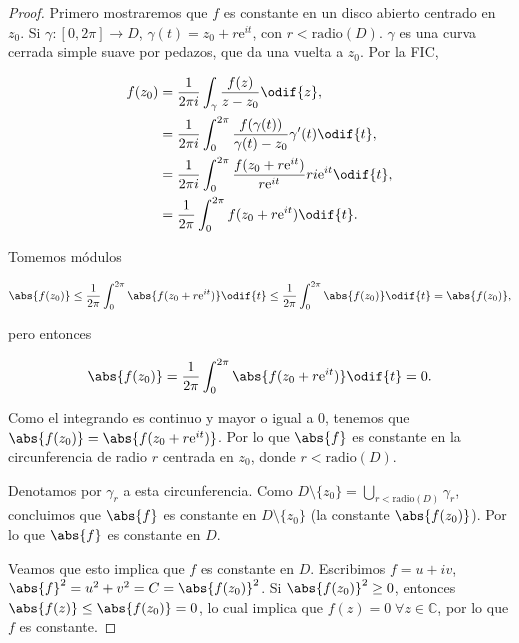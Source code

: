 \documentclass[../main.tex]{subfiles}
\begin{document}
\begin{proof}
    Primero mostraremos que \(f\) es constante en un disco abierto centrado en
    \(z_{0}\). Si \(\gamma \colon [0, 2\pi] \to D\), \(\gamma(t) = z_{0} + r
    \mathrm{e}^{it}\), con \( r < \mathrm{radio}(D)\). \(\gamma\) es una
    curva cerrada simple
    suave por pedazos, que da una vuelta a \(z_{0}\). Por la FIC,

    \begin{align*}
        f(z_{0}) &= \dfrac{1}{2\pi i}\int_{\gamma}^{}\dfrac{f(z)}{z - z_{0}}\odif{z},\\
        &= \dfrac{1}{2\pi i}\int_{0}^{2\pi}\dfrac{f(\gamma(t))}{\gamma(t) -
        z_{0}}\gamma^{\prime}(t)\odif{t},\\
        &= \dfrac{1}{2\pi i}\int_{0}^{2\pi}\dfrac{f(z_{0} + r \mathrm{e}^{it})}{r
        \mathrm{e}^{it}}ri \mathrm{e}^{it}\odif{t},\\
        &= \dfrac{1}{2\pi}\int_{0}^{2\pi}f(z_{0} + r \mathrm{e}^{it})\odif{t}.
    \end{align*}

    Tomemos módulos

    \begin{equation*}
        \abs{f(z_{0})} \leq \dfrac{1}{2\pi}\int_{0}^{2\pi}\abs{f(z_{0} + r
        \mathrm{e}^{it})}\odif{t} \leq
        \dfrac{1}{2\pi}\int_{0}^{2\pi}\abs{f(z_{0})}\odif{t} =
        \abs{f(z_{0})},
    \end{equation*}

    pero entonces

    \begin{equation*}
        \abs{f(z_{0})} = \dfrac{1}{2\pi} \int_{0}^{2\pi}\abs{f(z_{0} + r
        \mathrm{e}^{it})}\odif{t} = 0.
    \end{equation*}

    Como el integrando es continuo y mayor o igual a 0, tenemos que \(\abs{f(z_{0})} =
    \abs{f(z_{0} + r \mathrm{e}^{it})}\). Por lo que \(\abs{f}\) es constante en la
    circunferencia de radio \(r\) centrada en \(z_{0}\), donde \(r <
    \mathrm{radio}(D)\).

    Denotamos por \(\gamma_{r}\) a esta circunferencia. Como \(D\setminus \{z_{0}\} =
    \bigcup_{r < \mathrm{radio}(D)}\gamma_{r}\), concluimos que \(\abs{f}\)
    es constante en
    \(D\setminus \{z_{0}\}\) (la constante \(\abs{f(z_{0})}\)). Por lo que
    \(\abs{f}\) es
    constante en \(D\).

    Veamos que esto implica que \(f\) es constante en \(D\). Escribimos \(f = u + iv\),
    \(\abs{f}^{2} = u^{2} + v^{2} = C = \abs{f(z_{0})}^{2}\). Si
    \(\abs{f(z_{0})}^{2} \geq
    0\), entonces \(\abs{f(z)} \leq \abs{f(z_{0})} = 0\), lo cual implica que
    \(f(z) = 0\;
    \forall z\in \mathbb{C}\), por lo que \(f\) es constante.


\end{proof}
\end{document}
